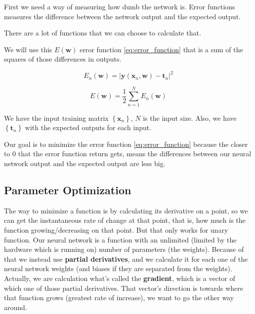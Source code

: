 \documentclass[a4paper,12pt]{article}
\theoremstyle{mytheoremstyle}
\theoremstyle{mytheoremstyle}
\theoremstyle{myproblemstyle}
\begin{document}
    First we need a way of measuring how dumb the network is. Error functions
    measures the difference between the network output and the expected output.

    There are a lot of functions that we can choose to calculate that.

    We will use this $ E \left( \mathbf{w} \right) $ error function
    \eqref{eq:error_function} that is a sum of the squares of those differences
    in outputs.

    \begin{equation}
        E_{n} \left( \mathbf{w} \right) = \left| \mathbf{y}(\mathbf{x}_{n}, \mathbf{w}) - \mathbf{t}_{n} \right|^{2}
    \end{equation}

    \begin{equation}
        E \left( \mathbf{w} \right) = \frac{1}{2} \displaystyle\sum_{n=1}^{N} E_{n}(\mathbf{w})
        \label{eq:error_function}
    \end{equation}

    We have the input training matrix $ \left\{ \mathbf{x}_{n} \right\} $, $ N $
    is the input size. Also, we have $ \left\{ \mathbf{t}_{n} \right\} $ with the
    expected outputs for each input.

    Our goal is to minimize the error function \eqref{eq:error_function}
    because the closer to 0 that the error function return gets, means the
    differences between our neural network output and the expected output are
    less big.

    \subsection{Parameter Optimization}

    The way to minimize a function is by calculating its derivative on a point,
    so we can get the instantaneous rate of change at that point, that is, how
    much is the function growing/decreasing on that point. But that only works
    for unary function. Our neural network is a function with an unlimited
    (limited by the hardware which is running on) number of parameters (the
    weights). Because of that we instead use \textbf{partial derivatives}, and
    we calculate it for each one of the neural network weights (and biases if
    they are separated from the weights). Actually, we are calculation what's
    called the \textbf{gradient}, which is a vector of which one of those
    partial derivatives. That vector's direction is towards where that function
    grows (greatest rate of increase), we want to go the other way around.
\end{document}
